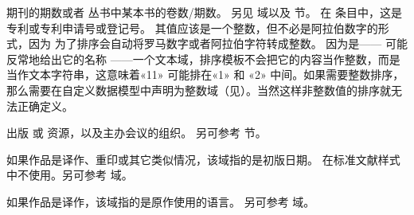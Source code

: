 \begin{fieldlist}

期刊的期数或者  丛书中某本书的卷数\slash 期数。
另见  域以及  节。
在  条目中，这是专利或专利申请号或登记号。
其值应该是一个整数，但不必是阿拉伯数字的形式，因为 \biber 为了排序会自动将罗马数字或者阿拉伯字符转成整数。
因为是—— 可能反常地给出它的名称 ——一个文本域，排序模板不会把它的内容当作整数，而是当作文本字符串，这意味着«11» 可能排在«1» 和 «2» 中间。如果需要整数排序，那么需要在自定义数据模型中声明为整数域（见）。当然这样非整数值的排序就无法正确定义。







出版  或  资源，以及主办会议的组织。
另可参考  节。




如果作品是译作、重印或其它类似情况，该域指的是初版日期。
在标准文献样式中不使用。另可参考  域。






如果作品是译作，该域指的是原作使用的语言。
另可参考  域。




\end{fieldlist}
